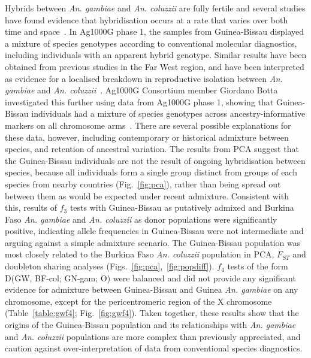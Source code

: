 \documentclass[a4paper,11pt,abstracton,hidelinks]{scrartcl}
\begin{document}
Hybrids between \textit{An. gambiae} and \textit{An. coluzzii} are fully fertile and several studies have found evidence that hybridisation occurs at a rate that varies over both time and space~\parencite{Lee2013,Weetman2012}.
%
In Ag1000G phase 1, the samples from Guinea-Bissau displayed a mixture of species genotypes according to conventional molecular diagnostics, including individuals with an apparent hybrid genotype.
%
Similar results have been obtained from previous studies in the Far West region, and have been interpreted as evidence for a localised breakdown in reproductive isolation between \textit{An. gambiae} and \textit{An. coluzzii}~\parencite{Oliveira2008,Marsden2011,Weetman2012,Gordicho2014,Vicente2017}.
%
Ag1000G Consortium member Giordano Botta investigated this further using data from Ag1000G phase 1, showing that Guinea-Bissau individuals had a mixture of species genotypes across ancestry-informative markers on all chromosome arms~\parencite{Ag1000G2017}.
%
There are several possible explanations for these data, however, including contemporary or historical admixture between species, and retention of ancestral variation.
%
The results from PCA suggest that the Guinea-Bissau individuals are not the result of ongoing hybridisation between species, because all individuals form a single group distinct from groups of each species from nearby countries (Fig.~\ref{fig:pca}), rather than being spread out between them as would be expected under recent admixture.
%
Consistent with this, results of $f_3$ tests with Guinea-Bissau as putatively admixed and Burkina Faso \textit{An. gambiae} and \textit{An. coluzzii} as donor populations were significantly positive, indicating allele frequencies in Guinea-Bissau were not intermediate and arguing against a simple admixture scenario.
%
The Guinea-Bissau population was most closely related to the Burkina Faso \textit{An. coluzzii} population in PCA, $F_{ST}$ and doubleton sharing analyses (Figs.~\ref{fig:pca},~\ref{fig:popdiff}).
%
$f_4$ tests of the form D(GW, BF-col; GN-gam; O) were balanced and did not provide any significant evidence for admixture between Guinea-Bissau and Guinea \textit{An. gambiae} on any chromosome, except for the pericentromeric region of the X chromosome (Table~\ref{table:gwf4}; Fig.~\ref{fig:gwf4}).
%
Taken together, these results show that the origins of the Guinea-Bissau population and its relationships with \textit{An. gambiae} and \textit{An. coluzzii} populations are more complex than previously appreciated, and caution against over-interpretation of data from conventional species diagnostics.
\end{document}
